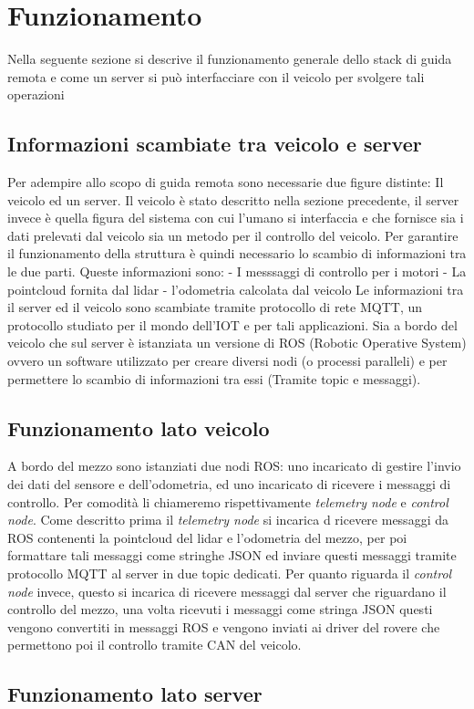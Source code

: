 \section{Funzionamento}
Nella seguente sezione si descrive il funzionamento generale dello stack di guida remota e come un server si può interfacciare con il veicolo per svolgere tali operazioni
\subsection{Informazioni scambiate tra veicolo e server}
Per adempire allo scopo di guida remota sono necessarie due figure distinte: Il veicolo ed un server. Il veicolo è stato descritto nella sezione precedente, il server invece è quella figura del sistema con cui l'umano si interfaccia e che fornisce sia i dati prelevati dal veicolo sia un metodo per il controllo del veicolo.
Per garantire il funzionamento della struttura è quindi necessario lo scambio di informazioni tra le due parti. Queste informazioni sono:
- I messsaggi di controllo per i motori
- La pointcloud fornita dal lidar
- l'odometria calcolata dal veicolo
Le informazioni tra il server ed il veicolo sono scambiate tramite protocollo di rete MQTT, un protocollo studiato per il mondo dell'IOT e per tali applicazioni.
Sia a bordo del veicolo che sul server è istanziata un versione di ROS (Robotic Operative System) ovvero un software utilizzato per creare diversi nodi (o processi paralleli) e per permettere lo scambio di informazioni tra essi (Tramite topic e messaggi).
\subsection{Funzionamento lato veicolo}
A bordo del mezzo sono istanziati due nodi ROS: uno incaricato di gestire l'invio dei dati del sensore e dell'odometria, ed uno incaricato di ricevere i messaggi di controllo. Per comodità li chiameremo rispettivamente \textit{telemetry node} e \textit{control node}. 
Come descritto prima il \textit{telemetry node} si incarica d ricevere messaggi da ROS contenenti la pointcloud del lidar e l'odometria del mezzo, per poi formattare tali messaggi come stringhe JSON ed inviare questi messaggi tramite protocollo MQTT al server in due topic dedicati.
Per quanto riguarda il \textit{control node} invece, questo si incarica di ricevere messaggi dal server che riguardano il controllo del mezzo, una volta ricevuti i messaggi come stringa JSON questi vengono convertiti in messaggi ROS e vengono inviati ai driver del rovere che permettono poi il controllo tramite CAN del veicolo.
\subsection{Funzionamento lato server}
